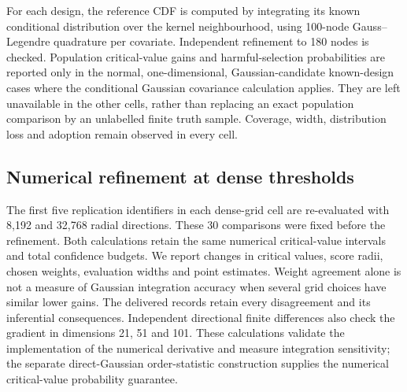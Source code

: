 For each design, the reference CDF is computed by integrating its known conditional distribution over the kernel neighbourhood, using 100-node Gauss--Legendre quadrature per covariate. Independent refinement to 180 nodes is checked. Population critical-value gains and harmful-selection probabilities are reported only in the normal, one-dimensional, Gaussian-candidate known-design cases where the conditional Gaussian covariance calculation applies. They are left unavailable in the other cells, rather than replacing an exact population comparison by an unlabelled finite truth sample. Coverage, width, distribution loss and adoption remain observed in every cell.

\subsection{Numerical refinement at dense thresholds}
The first five replication identifiers in each dense-grid cell are re-evaluated with 8,192 and 32,768 radial directions. These 30 comparisons were fixed before the refinement. Both calculations retain the same numerical critical-value intervals and total confidence budgets. We report changes in critical values, score radii, chosen weights, evaluation widths and point estimates. Weight agreement alone is not a measure of Gaussian integration accuracy when several grid choices have similar lower gains. The delivered records retain every disagreement and its inferential consequences. Independent directional finite differences also check the gradient in dimensions 21, 51 and 101. These calculations validate the implementation of the numerical derivative and measure integration sensitivity; the separate direct-Gaussian order-statistic construction supplies the numerical critical-value probability guarantee.


